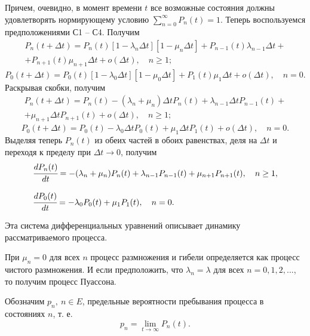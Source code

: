 Причем, очевидно, в момент времени $t$ все возможные состояния должны удовлетворять нормирующему условию $\sum\limits_{n = 0}^\infty  {{P_n}(t)}  = 1$.
Теперь воспользуемся предположениями С1 -- С4. Получим
\begin{multline*}
 {P_n}(t + \Delta t) = {P_n}(t)[1 - {\lambda _n}\Delta t][1 - {\mu _n}\Delta t] + {P_{n - 1}}(t){\lambda _{n - 1}}\Delta t + \\
+ {P_{n + 1}}(t){\mu _{n + 1}}\Delta t + o(\Delta t),\quad n \ge 1 ;
\end{multline*}
\[{P_0}(t + \Delta t) = {P_0}(t)[1 - {\lambda _0}\Delta t][1 - {\mu _0}\Delta t] + {P_1}(t){\mu _1}\Delta t + o(\Delta t),\quad n = 0 .\]
Раскрывая скобки, получим
\begin{multline*}
{P_n}(t + \Delta t) = {P_n}(t) - ({\lambda _n} + {\mu _n})\Delta t{P_n}(t) + {\lambda _{n - 1}}\Delta t{P_{n - 1}}(t) + \\
+ {\mu _{n + 1}}\Delta t{P_{n + 1}}(t) + o(\Delta t),\quad n \ge 1 ;
\end{multline*}
\[{P_0}(t + \Delta t) = {P_0}(t) - {\lambda _0}\Delta t{P_0}(t) + {\mu _1}\Delta t{P_1}(t) + o(\Delta t),\quad n = 0 .\]
Выделяя теперь ${P_n}(t)$ из обеих частей в обоих равенствах, деля на $\Delta t$ и переходя к пределу при $\Delta t \to 0$, получим
\begin{equation}
\begin{array}{ll}
\cfrac{{d{P_n}(t)}}{{dt}} =  - ({\lambda _n} + {\mu _n}){P_n}(t) + {\lambda _{n - 1}}{P_{n - 1}}(t) + {\mu _{n + 1}}{P_{n + 1}}(t),\quad n \ge 1 , \\ \\
\cfrac{{d{P_0}(t)}}{{dt}} =  - {\lambda _0}{P_0}(t) + {\mu _1}{P_1}(t),\quad n = 0 .
\end{array}
\label{eq:1.3}
\end{equation}

Эта система дифференциальных уравнений описывает динамику рассматриваемого процесса.

При ${\mu _n} = 0$ для всех $n$ процесс размножения и гибели определяется как процесс чистого размножения. И если предположить, что ${\lambda _n} = \lambda$ для всех $n = 0,1,2,...$, то получим процесс Пуассона.

Обозначим ${p_n},~n \in E$, предельные вероятности пребывания процесса в состояниях $n$, т. е.
\[{p_n} = \mathop {\lim }\limits_{t \to \infty } {P_n}(t) .\]


